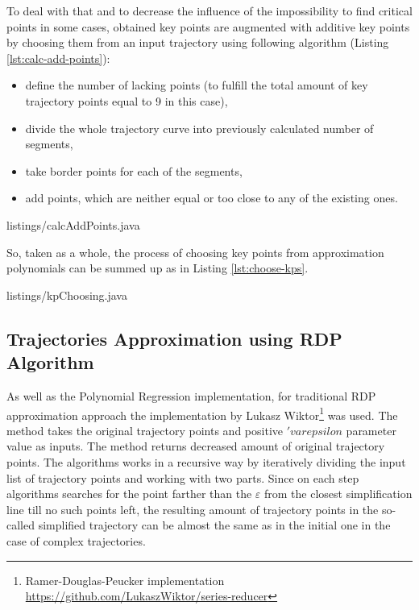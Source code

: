 To deal with that and to decrease the influence of the impossibility to find critical points in some cases, obtained key points are augmented with additive key points by choosing them from an input trajectory using following algorithm (Listing \ref{lst:calc-add-points}):

\begin{itemize}
	\setlength\itemsep{0em}
	\item define the number of lacking points (to fulfill the total amount of key trajectory points equal to 9 in this case),
	\item divide the whole trajectory curve into previously calculated number of segments,
	\item take border points for each of the segments,
	\item add points, which are neither equal or too close to any of the existing ones.
\end{itemize}

 {listings/calcAddPoints.java}

So, taken as a whole, the process of choosing key points from approximation polynomials can be summed up as in Listing \ref{lst:choose-kps}.

 {listings/kpChoosing.java}

\subsection{Trajectories Approximation using RDP Algorithm}

As well as the Polynomial Regression implementation, for traditional RDP approximation approach the implementation by Lukasz Wiktor\footnote{Ramer-Douglas-Peucker implementation \url{https://github.com/LukaszWiktor/series-reducer}} was used. The method takes the original trajectory points and positive $'varepsilon$ parameter value as inputs. The method returns decreased amount of original trajectory points. The algorithms works in a recursive way by iteratively dividing the input list of trajectory points and working with two parts. Since on each step algorithms searches for the point farther than the $\varepsilon$ from the closest simplification line till no such points left, the resulting amount of trajectory points in the so-called simplified trajectory can be almost the same as in the initial one in the case of complex trajectories.

